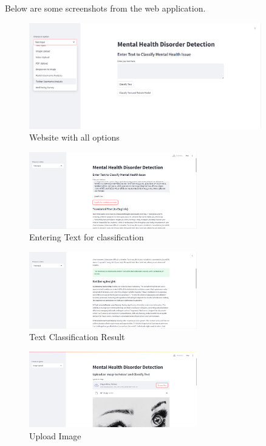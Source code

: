 \noindent
Below are some screenshots from the web application.

\begin{figure}[h!]  
    \centering
    \includegraphics[width=0.9\textwidth]{App Images/01 Interface.png}  
    \caption{Website with all options}
    \label{01i}  %
\end{figure}

\begin{figure}[h!]  
    \centering
    \includegraphics[width=0.65\textwidth]{App Images/02 Interface.png}  
    \caption{Entering Text for classification}
    \label{02i}  %
\end{figure}

\begin{figure}[h!]  
    \centering
    \includegraphics[width=0.65\textwidth]{App Images/03 Interface.png}  
    \caption{Text Classification Result}
    \label{03i}  %
\end{figure}


\begin{figure}[h!]  
    \centering
    \includegraphics[width=0.65\textwidth]{App Images/04 Interface.png}  
    \caption{Upload Image}
    \label{04i}  %
\end{figure}

